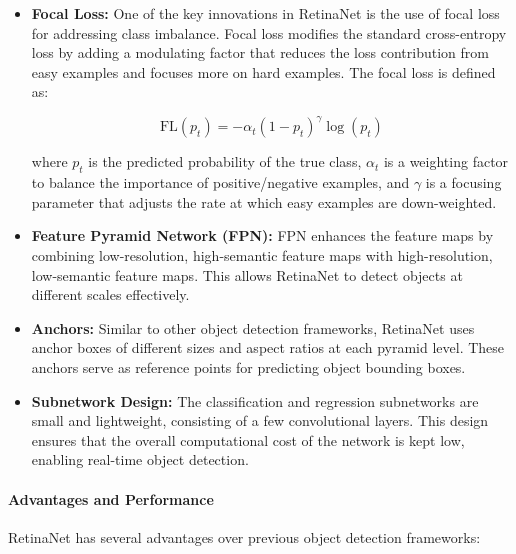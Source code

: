 \documentclass[12pt]{article}
\begin{document}
\begin{itemize}
    \item \textbf{Focal Loss:} One of the key innovations in RetinaNet is the use of focal loss for addressing class imbalance. Focal loss modifies the standard cross-entropy loss by adding a modulating factor that reduces the loss contribution from easy examples and focuses more on hard examples. The focal loss is defined as:

    \[
    \text{FL}(p_t) = -\alpha_t (1 - p_t)^\gamma \log(p_t)
    \]

    where \( p_t \) is the predicted probability of the true class, \(\alpha_t\) is a weighting factor to balance the importance of positive/negative examples, and \(\gamma\) is a focusing parameter that adjusts the rate at which easy examples are down-weighted.

    \item \textbf{Feature Pyramid Network (FPN):} FPN enhances the feature maps by combining low-resolution, high-semantic feature maps with high-resolution, low-semantic feature maps. This allows RetinaNet to detect objects at different scales effectively.

    \item \textbf{Anchors:} Similar to other object detection frameworks, RetinaNet uses anchor boxes of different sizes and aspect ratios at each pyramid level. These anchors serve as reference points for predicting object bounding boxes.

    \item \textbf{Subnetwork Design:} The classification and regression subnetworks are small and lightweight, consisting of a few convolutional layers. This design ensures that the overall computational cost of the network is kept low, enabling real-time object detection.
\end{itemize}

\paragraph{Advantages and Performance}

RetinaNet has several advantages over previous object detection frameworks:
\end{document}
